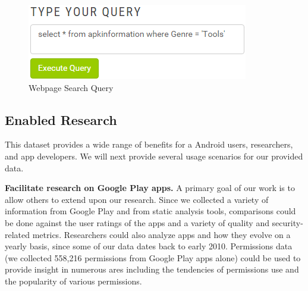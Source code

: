 \documentclass{sig-alternate-05-2015}
\begin{document}
\begin{figure}[ht!]
\centering
\includegraphics[width=\columnwidth, angle = 0, scale=.8]{images/webpageQuery2.png}
\caption{Webpage Search Query}
\label{fig:webpagequery}
\end{figure}





%
%
%	
%	
%        	 	





\subsection{Enabled Research}


This dataset provides a wide range of benefits for a Android users, researchers, and app developers. We will next provide several usage scenarios for our provided data.


\textbf{Facilitate research on Google Play apps.} A primary goal of our work is to allow others to extend upon our research. Since we collected a variety of information from Google Play and from static analysis tools, comparisons could be done against the user ratings of the apps and a variety of quality and security-related metrics. Researchers could also analyze apps and how they evolve on a yearly basis, since some of our data dates back to early 2010. Permissions data (we collected 558,216 permissions from Google Play apps alone) could be used to provide insight in numerous ares including the tendencies of permissions use and the popularity of various permissions.
\end{document}
